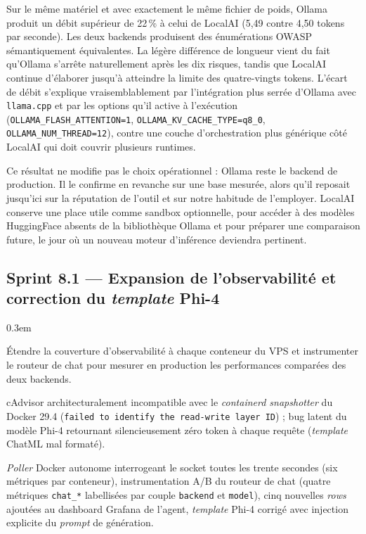         Sur le même matériel et avec exactement le même fichier de poids, Ollama
        produit un débit supérieur de 22\,\% à celui de LocalAI (5,49 contre 4,50
        tokens par seconde). Les deux backends produisent des énumérations OWASP
        sémantiquement équivalentes. La légère différence de longueur vient du fait
        qu'Ollama s'arrête naturellement après les dix risques, tandis que LocalAI
        continue d'élaborer jusqu'à atteindre la limite des quatre-vingts tokens.
        L'écart de débit s'explique vraisemblablement par l'intégration plus serrée
        d'Ollama avec \texttt{llama.cpp} et par les options qu'il active à
        l'exécution (\texttt{OLLAMA\_\allowbreak{}FLASH\_\allowbreak{}ATTENTION=1},
        \texttt{OLLAMA\_\allowbreak{}KV\_\allowbreak{}CACHE\_\allowbreak{}TYPE=q8\_\allowbreak{}0}, \texttt{OLLAMA\_\allowbreak{}NUM\_\allowbreak{}THREAD=12}),
        contre une couche d'orchestration plus générique côté LocalAI qui doit
        couvrir plusieurs runtimes.

        Ce résultat ne modifie pas le choix opérationnel : Ollama reste le backend de
        production. Il le confirme en revanche sur une base mesurée, alors qu'il reposait
        jusqu'ici sur la réputation de l'outil et sur notre habitude de l'employer. LocalAI
        conserve une place utile comme sandbox optionnelle, pour accéder à des modèles
        HuggingFace absents de la bibliothèque Ollama et pour préparer une comparaison
        future, le jour où un nouveau moteur d'inférence deviendra pertinent.

    \subsection{Sprint 8.1 — Expansion de l'observabilité et correction du \textit{template} Phi-4}

        \begin{description}
            \itemsep 0.3em
            \item[Objectif du sprint :] Étendre la couverture d'observabilité à
                chaque conteneur du VPS et instrumenter le routeur de chat pour
                mesurer en production les performances comparées des deux backends.
            \item[Obstacles rencontrés :] cAdvisor architecturalement incompatible
                avec le \textit{containerd snapshotter} du Docker 29.4
                (\texttt{failed to identify the read-write layer ID}) ; bug latent
                du modèle Phi-4 retournant silencieusement zéro token à chaque
                requête (\textit{template} ChatML mal formaté).
            \item[Livrable :] \textit{Poller} Docker autonome interrogeant le
                socket toutes les trente secondes (six métriques par conteneur),
                instrumentation A/B du routeur de chat (quatre métriques
                \texttt{chat\_*} labellisées par couple \texttt{backend} et
                \texttt{model}), cinq nouvelles \textit{rows} ajoutées au dashboard
                Grafana de l'agent, \textit{template} Phi-4 corrigé avec injection
                explicite du \textit{prompt} de génération.
        \end{description}

